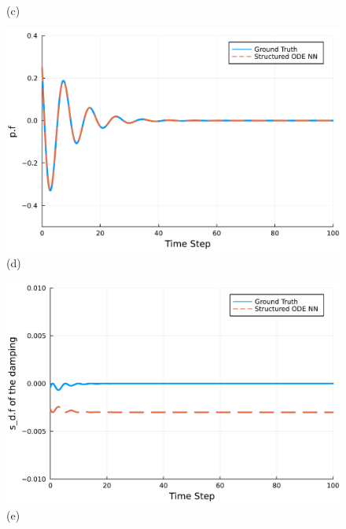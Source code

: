 \documentclass[
	parskip, 			   %
	twoside, 			   %
	DIV=14, 			   %
	BCOR=15.0mm, 		   %
	headsepline, 		   %
	open=right, 		   %
	captions=tableheading, %
	bibliography=totoc,    %
	numbers=noenddot       %
]{scrreprt}
\begin{document}
\begin{figure}[h!]
\begin{minipage}{.3\textwidth}
    \\(c)
    \end{minipage}
    \begin{minipage}{.3\textwidth}
    \centering
    \includegraphics[width=1\linewidth]{figures/p.f_compositional_ndho.pdf}
    \\(d)
    \end{minipage}%
    \begin{minipage}{.3\textwidth}
    \centering
    \includegraphics[width=1\linewidth]{figures/sd_d.f_compositional_ndho.pdf}
    \\(e)
    \end{minipage}%
    \begin{minipage}{.3\textwidth}
    \centering

\end{minipage}
\end{figure}
\end{document}
